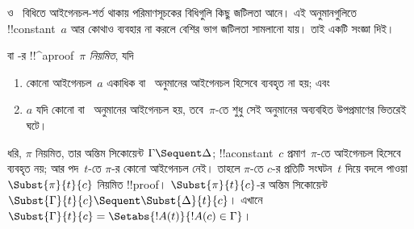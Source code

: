 \documentclass[../../../include/open-logic-section]{subfiles}
\begin{document}


\LeftR{\lexists} ও~\RightR{\lforall}
বিধিতে আইগেনচল-শর্ত থাকায়
পরিমাণসূচকের বিধিগুলি কিছু
জটিলতা আনে। এই অনুমানগুলিতে
!!{constant}~$a$ আর কোথাও
ব্যবহার না করলে বেশির ভাগ
জটিলতা সামলানো যায়।
তাই একটি সংজ্ঞা দিই।

\begin{defn}
 বা -র
!!^a{proof}~$\pi$ \emph{নিয়মিত},
যদি
\begin{enumerate}
  \item কোনো আইগেনচল~$a$
  একাধিক \LeftR{\lexists}
  বা~\RightR{\lforall}
  অনুমানের আইগেনচল
  হিসেবে ব্যবহৃত না হয়; এবং
  \item $a$ যদি কোনো
  \LeftR{\lexists}
  বা~\RightR{\lforall}
  অনুমানের আইগেনচল হয়,
  তবে~$\pi$-তে শুধু সেই
  অনুমানের অব্যবহিত
  উপপ্রমাণের ভিতরেই ঘটে।
\end{enumerate}
\end{defn}

\begin{lem}
ধরি, $\pi$ নিয়মিত,
তার অন্তিম সিকোয়েন্ট
$\Gamma \Sequent \Delta$;
!!a{constant}~$c$ প্রমাণ~$\pi$-তে
আইগেনচল হিসেবে ব্যবহৃত নয়;
আর পদ~$t$-তে $\pi$-র
কোনো আইগেনচল নেই।
তাহলে $\pi$-তে $c$-র
প্রতিটি সংঘটন~$t$ দিয়ে
বদলে পাওয়া
$\Subst{\pi}{t}{c}$
নিয়মিত !!{proof}।
$\Subst{\pi}{t}{c}$-র
অন্তিম সিকোয়েন্ট
$\Subst{\Gamma}{t}{c}
\Sequent \Subst{\Delta}{t}{c}$।
এখানে $\Subst{\Gamma}{t}{c} =
\Setabs{!A(t)}{!A(c) \in \Gamma}$।
\end{lem}
\end{document}
